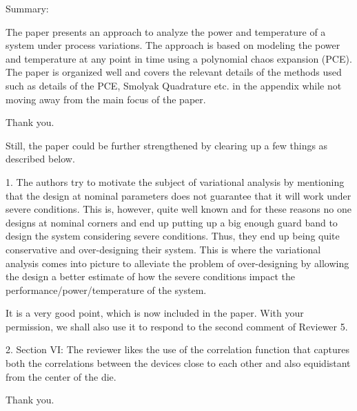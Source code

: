 \begin{reviewer}
Summary:

The paper presents an approach to analyze the power and temperature of a system under process variations. The approach is based on modeling the power and temperature at any point in time using a polynomial chaos expansion (PCE). The paper is organized well and covers the relevant details of the methods used such as details of the PCE, Smolyak Quadrature etc. in the appendix while not moving away from the main focus of the paper.
\end{reviewer}
\begin{authors}
Thank you.
\end{authors}

\begin{reviewer}
Still, the paper could be further strengthened by clearing up a few things as described below.

1. The authors try to motivate the subject of variational analysis by mentioning that the design at nominal parameters does not guarantee that it will work under severe conditions. This is, however, quite well known and for these reasons no one designs at nominal corners and end up putting up a big enough guard band to design the system considering severe conditions. Thus, they end up being quite conservative and over-designing their system. This is where the variational analysis comes into picture to alleviate the problem of over-designing by allowing the design a better estimate of how the severe conditions impact the performance/power/temperature of the system.
\end{reviewer}
\begin{authors}
It is a very good point, which is now included in the paper. With your permission, we shall also use it to respond to the second comment of Reviewer 5.

\end{authors}

\begin{reviewer}
2. Section VI: The reviewer likes the use of the correlation function that captures both the correlations between the devices close to each other and also equidistant from the center of the die.
\end{reviewer}
\begin{authors}
Thank you.
\end{authors}

